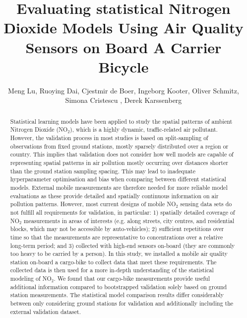 \documentclass{article}
\title{Evaluating statistical Nitrogen Dioxide Models Using Air Quality Sensors on Board A Carrier Bicycle}
\author{Meng Lu,  Ruoying Dai,  Cjestmir de Boer, Ingeborg Kooter, Oliver Schmitz, Simona Cristescu , Derek Karssenberg}
\date{}
\begin{document}
\maketitle

\begin{abstract}
Statistical learning models have been applied to study the spatial patterns of ambient Nitrogen Dioxide (NO$_2$), which is a highly dynamic, traffic-related air pollutant. However, the validation process in most studies is based on split-sampling of observations from fixed ground stations, mostly sparsely distributed over a region or country. This implies that validation does not consider how well models are capable of representing spatial patterns in air pollution mostly occurring over distances shorter than the ground station sampling spacing. This may lead to inadequate hyperparameter optimisation and bias when comparing between different statistical models. External mobile measurements are therefore needed for more reliable model evaluations as these provide detailed and spatially continuous information on air pollution patterns. However, most current designs of mobile NO$_2$ sensing data sets do not fulfill all requirements for validation, in particular: 1) spatially detailed coverage of NO$_2$ measurements in areas of interests (e.g. along streets, city centres, and residential blocks, which may not be accessible by auto-vehicles); 2) sufficient repetitions over time so that the measurements are representative to concentrations over a relative long-term period; and 3) collected with high-end sensors on-board (they are commonly too heavy to be carried by a person). In this study, we installed a mobile air quality station on-board  a cargo-bike to collect data that meet these requirements. The collected data is then used for a more in-depth understanding of the statistical modeling of NO$_2$. We found that our cargo-bike measurements provide useful additional information compared to bootstrapped validation solely based on ground station measurements. The statistical model comparison results differ considerably between only considering ground stations for validation and additionally including the external validation dataset. 

 
\end{abstract}
\end{document}
